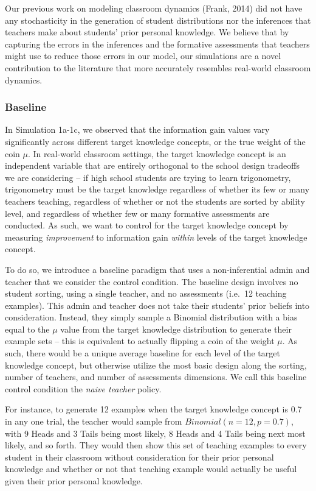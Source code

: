 \documentclass[10pt, letterpaper]{article}
\begin{document}
Our previous work on modeling classroom dynamics (Frank, 2014) did not
have any stochasticity in the generation of student distributions nor
the inferences that teachers make about students' prior personal
knowledge. We believe that by capturing the errors in the inferences and
the formative assessments that teachers might use to reduce those errors
in our model, our simulations are a novel contribution to the literature
that more accurately resembles real-world classroom dynamics.

\subsubsection{Baseline}\label{baseline}

In Simulation 1a-1c, we observed that the information gain values vary
significantly across different target knowledge concepts, or the true
weight of the coin \(\mu\). In real-world classroom settings, the target
knowledge concept is an independent variable that are entirely
orthogonal to the school design tradeoffs we are considering -- if high
school students are trying to learn trigonometry, trigonometry must be
the target knowledge regardless of whether its few or many teachers
teaching, regardless of whether or not the students are sorted by
ability level, and regardless of whether few or many formative
assessments are conducted. As such, we want to control for the target
knowledge concept by measuring \emph{improvement} to information gain
\emph{within} levels of the target knowledge concept.

To do so, we introduce a baseline paradigm that uses a non-inferential
admin and teacher that we consider the control condition. The baseline
design involves no student sorting, using a single teacher, and no
assessments (i.e.~12 teaching examples). This admin and teacher does not
take their students' prior beliefs into consideration. Instead, they
simply sample a Binomial distribution with a bias equal to the \(\mu\)
value from the target knowledge distribution to generate their example
sets -- this is equivalent to actually flipping a coin of the weight
\(\mu\). As such, there would be a unique average baseline for each
level of the target knowledge concept, but otherwise utilize the most
basic design along the sorting, number of teachers, and number of
assessments dimensions. We call this baseline control condition the
\emph{naive teacher} policy.

For instance, to generate 12 examples when the target knowledge concept
is 0.7 in any one trial, the teacher would sample from
\(Binomial(n=12, p=0.7)\), with 9 Heads and 3 Tails being most likely, 8
Heads and 4 Tails being next most likely, and so forth. They would then
show this set of teaching examples to every student in their classroom
without consideration for their prior personal knowledge and whether or
not that teaching example would actually be useful given their prior
personal knowledge.
\end{document}
